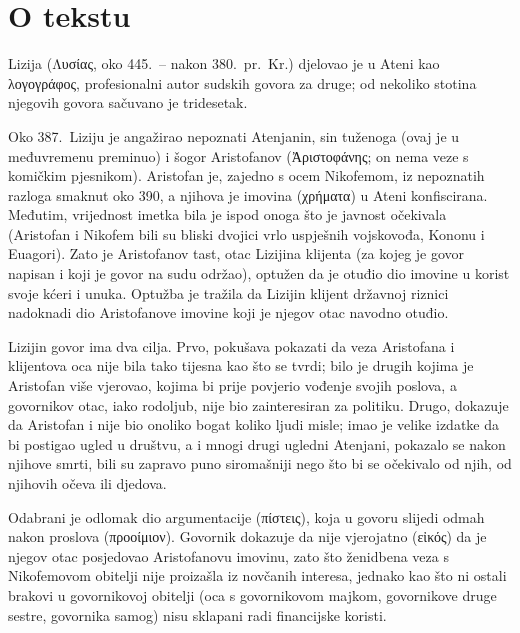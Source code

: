 


\section*{O tekstu}

Lizija (Λυσίας, oko 445.\ – nakon 380.\ pr.~Kr.) djelovao je u Ateni kao λογογράφος, profesionalni autor sudskih govora za druge; od nekoliko stotina njegovih govora sačuvano je tridesetak.

Oko 387.\ Liziju je angažirao nepoznati Atenjanin, sin tuženoga (ovaj je u međuvremenu preminuo) i šogor Aristofanov (Ἀριστοφάνης; on nema veze s komičkim pjesnikom). Aristofan je, zajedno s ocem Nikofemom, iz nepoznatih razloga smaknut oko 390, a njihova je imovina (χρήματα) u Ateni konfiscirana. Međutim, vrijednost imetka bila je ispod onoga što je javnost očekivala (Aristofan i Nikofem bili su bliski dvojici vrlo uspješnih vojskovođa, Kononu i Euagori). Zato je Aristofanov tast, otac Lizijina klijenta (za kojeg je govor napisan i koji je govor na sudu održao), optužen da je otuđio dio imovine u korist svoje kćeri i unuka. Optužba je tražila da Lizijin klijent državnoj riznici nadoknadi dio Aristofanove imovine koji je njegov otac navodno otuđio.

Lizijin govor ima dva cilja. Prvo, pokušava pokazati da veza Aristofana i klijentova oca nije bila tako tijesna kao što se tvrdi; bilo je drugih kojima je Aristofan više vjerovao, kojima bi prije povjerio vođenje svojih poslova, a govornikov otac, iako rodoljub, nije bio zainteresiran za politiku. Drugo, dokazuje da Aristofan i nije bio onoliko bogat koliko ljudi misle; imao je velike izdatke da bi postigao ugled u društvu, a i mnogi drugi ugledni Atenjani, pokazalo se nakon njihove smrti, bili su zapravo puno siromašniji nego što bi se očekivalo od njih, od njihovih očeva ili djedova.

Odabrani je odlomak dio argumentacije (πίστεις), koja u govoru slijedi odmah nakon proslova (προοίμιον). Govornik dokazuje da nije vjerojatno (εἰκός) da je njegov otac posjedovao Aristofanovu imovinu, zato što ženidbena veza s Nikofemovom obitelji nije proizašla iz novčanih interesa, jednako kao što ni ostali brakovi u govornikovoj obitelji (oca s govornikovom majkom, govornikove druge sestre, govornika samog) nisu sklapani radi financijske koristi.


